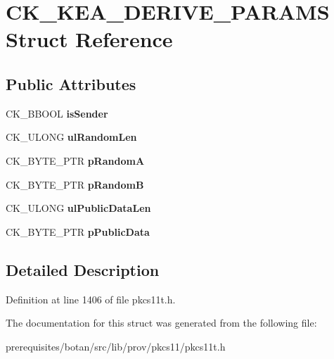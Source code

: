 \hypertarget{struct_c_k___k_e_a___d_e_r_i_v_e___p_a_r_a_m_s}{}\section{C\+K\+\_\+\+K\+E\+A\+\_\+\+D\+E\+R\+I\+V\+E\+\_\+\+P\+A\+R\+A\+MS Struct Reference}
\label{struct_c_k___k_e_a___d_e_r_i_v_e___p_a_r_a_m_s}
\subsection*{Public Attributes}
\begin{DoxyCompactItemize}
\item 
\mbox{\label{struct_c_k___k_e_a___d_e_r_i_v_e___p_a_r_a_m_s_af0877d5766fe83380e61e44ffa913c28}} 
C\+K\+\_\+\+B\+B\+O\+OL {\bfseries is\+Sender}
\item 
\mbox{\label{struct_c_k___k_e_a___d_e_r_i_v_e___p_a_r_a_m_s_a262da7e616b091eb5287cd0c04334c21}} 
C\+K\+\_\+\+U\+L\+O\+NG {\bfseries ul\+Random\+Len}
\item 
\mbox{\label{struct_c_k___k_e_a___d_e_r_i_v_e___p_a_r_a_m_s_a5c0c4f6be3ecb7ee67527cbbd282e3f0}} 
C\+K\+\_\+\+B\+Y\+T\+E\+\_\+\+P\+TR {\bfseries p\+RandomA}
\item 
\mbox{\label{struct_c_k___k_e_a___d_e_r_i_v_e___p_a_r_a_m_s_a271ca66a7ee8901646bbce325f79693a}} 
C\+K\+\_\+\+B\+Y\+T\+E\+\_\+\+P\+TR {\bfseries p\+RandomB}
\item 
\mbox{\label{struct_c_k___k_e_a___d_e_r_i_v_e___p_a_r_a_m_s_ab5dc5d78b8ef7e9b47131a892724d147}} 
C\+K\+\_\+\+U\+L\+O\+NG {\bfseries ul\+Public\+Data\+Len}
\item 
\mbox{\label{struct_c_k___k_e_a___d_e_r_i_v_e___p_a_r_a_m_s_a78d21f7c6d0e1088469f8fee48088266}} 
C\+K\+\_\+\+B\+Y\+T\+E\+\_\+\+P\+TR {\bfseries p\+Public\+Data}
\end{DoxyCompactItemize}


\subsection{Detailed Description}


Definition at line 1406 of file pkcs11t.\+h.



The documentation for this struct was generated from the following file\+:\begin{DoxyCompactItemize}
\item 
prerequisites/botan/src/lib/prov/pkcs11/pkcs11t.\+h\end{DoxyCompactItemize}
